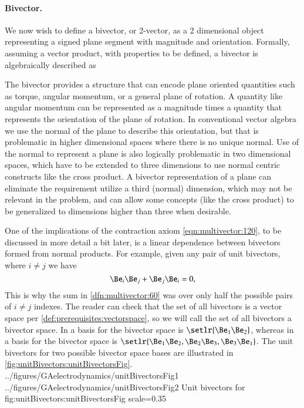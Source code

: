 \paragraph{Bivector.}

We now wish to define a bivector, or 2-vector, as a 2 dimensional object representing a signed plane segment with magnitude and orientation.  Formally,
assuming a vector product, with properties to be defined, a bivector is algebraically described as


The bivector provides a structure that can encode plane oriented quantities such as torque, angular momentum, or a general plane of rotation.
A quantity like angular momentum can be represented as a magnitude times a quantity that represents the orientation of the plane of rotation.
In conventional vector algebra we use the normal of the plane to describe this orientation, but that is problematic in higher dimensional spaces where there is no unique normal.
Use of the normal to represent a plane is also logically problematic in two dimensional spaces, which have to be extended to three dimensions to use normal centric constructs like the cross product.
A bivector representation of a plane can eliminate the requirement utilize a third (normal) dimension, which may not be relevant in the problem, and can allow some concepts (like the cross product) to be generalized to dimensions higher than three when desirable.

One of the implications of the contraction axiom \cref{eqn:multivector:120}, to be discussed in more detail a bit later, is a linear dependence between bivectors formed from normal products.  For example, given any pair of unit bivectors, where \( i \ne j \) we have
\begin{dmath}\label{eqn:multivector:n}
\Be_i \Be_j + \Be_j \Be_i = 0,
\end{dmath}
This is why the sum in \cref{dfn:multivector:60} was over only half the possible pairs of \( i \ne j \) indexes.   
The reader can check that the set of all bivectors is a vector space per 
\cref{def:prerequisites:vectorspace}, so we will call the set of all bivectors a bivector space.
In  a basis for the bivector space is \( \setlr{ \Be_1 \Be_2 } \), whereas in  a basis for the bivector space is
\( \setlr{ \Be_1 \Be_2, \Be_2 \Be_3, \Be_3 \Be_1 } \).  The unit bivectors for two possible  bivector space bases are illustrated in
\cref{fig:unitBivectors:unitBivectorsFig}.
\imageTwoFigures
{../figures/GAelectrodynamics/unitBivectorsFig1}
{../figures/GAelectrodynamics/unitBivectorsFig2}
{Unit bivectors for }
{fig:unitBivectors:unitBivectorsFig}
{scale=0.35}

